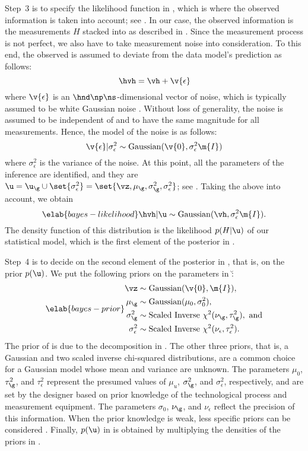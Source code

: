 Step~3 is to specify the likelihood function in , which is
where the observed information is taken into account; see
. In our case, the observed information is the
measurements $H$ stacked into \hvh as described in .
Since the measurement process is not perfect, we also have to take measurement
noise into consideration. To this end, the observed \hvh is assumed to deviate
from the data model's prediction \vh as follows:
\[
  \hvh = \vh + \v{\epsilon}
\]
where $\v{\epsilon}$ is an $\hnd \np \ns$-dimensional vector of noise, which is
typically assumed to be white Gaussian noise \cite{rasmussen2006, marzouk2009}.
Without loss of generality, the noise is assumed to be independent of \g and to
have the same magnitude for all measurements. Hence, the model of the noise is
as follows:
\[
  \v{\epsilon} | \sigma^2_\epsilon \sim \mathrm{Gaussian}(\v{0}, \sigma^2_\epsilon \m{I})
\]
where $\sigma^2_\epsilon$ is the variance of the noise. At this point, all the
parameters of the inference are identified, and they are $\u = \u_\g \cup
\set{\sigma_\epsilon^2} = \set{\vz, \mu_\g, \sigma_\g^2, \sigma_\epsilon^2}$;
see . Taking the above into account, we obtain
\begin{equation} \elab{bayes-likelihood}
  \hvh | \u \sim \mathrm{Gaussian}(\vh, \sigma_\epsilon^2 \m{I}).
\end{equation}
The density function of this distribution is the likelihood $p(H | \u)$ of our
statistical model, which is the first element of the posterior in
.

Step~4 is to decide on the second element of the posterior in
, that is, on the prior $p(\u)$. We put the following priors
on the parameters in \u:
\begin{align} \elab{bayes-prior}
  \begin{split}
    \vz               & \sim \mathrm{Gaussian}(\v{0}, \m{I}), \\
    \mu_\g            & \sim \mathrm{Gaussian}(\mu_0, \sigma^2_0), \\
    \sigma^2_\g       & \sim \mathrm{Scaled\ Inverse\ } \chi^2(\nu_\g, \tau^2_\g), \text{ and} \\
    \sigma^2_\epsilon & \sim \mathrm{Scaled\ Inverse\ } \chi^2(\nu_\epsilon, \tau^2_\epsilon).
  \end{split}
\end{align}
The prior of \vz is due to the decomposition in . The
other three priors, that is, a Gaussian and two scaled inverse chi-squared
distributions, are a common choice for a Gaussian model whose mean and variance
are unknown. The parameters $\mu_0$, $\tau^2_\g$, and $\tau^2_\epsilon$
represent the presumed values of $\mu_u$, $\sigma^2_\g$, and
$\sigma^2_\epsilon$, respectively, and are set by the designer based on prior
knowledge of the technological process and measurement equipment. The parameters
$\sigma_0$, $\nu_\g$, and $\nu_\epsilon$ reflect the precision of this
information. When the prior knowledge is weak, less specific priors can be
considered \cite{gelman2013}. Finally, $p(\u)$ in  is
obtained by multiplying the densities of the priors in .

